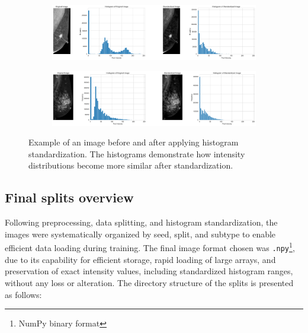 \documentclass[a4paper,10pt]{book}
\begin{document}
\begin{figure}[h!]
    \centering
    \begin{subfigure}[t]{1.0\textwidth}
        \centering
        \includegraphics[width=\textwidth]{reports//assets/standarized1.png}
        \label{fig:standarized_1}
    \end{subfigure}
    \begin{subfigure}[t]{1.0\textwidth}
        \centering
        \includegraphics[width=\textwidth]{reports//assets/standarized2.png}
        \label{fig:standardized_2}
    \end{subfigure}
    \caption[Histogram standardization result]{Example of an image before and after applying histogram standardization. The histograms demonstrate how intensity distributions become more similar after standardization.}
    \label{fig:standardized_examples}
\end{figure}

\subsection{Final splits overview}

Following preprocessing, data splitting, and histogram standardization, the images were systematically organized by seed, split, and subtype to enable efficient data loading during training. The final image format chosen was \texttt{.npy}\footnote{NumPy binary format}, due to its capability for efficient storage, rapid loading of large arrays, and preservation of exact intensity values, including standardized histogram ranges, without any loss or alteration. The directory structure of the splits is presented as follows:

\vspace{0.5cm}
\end{document}
